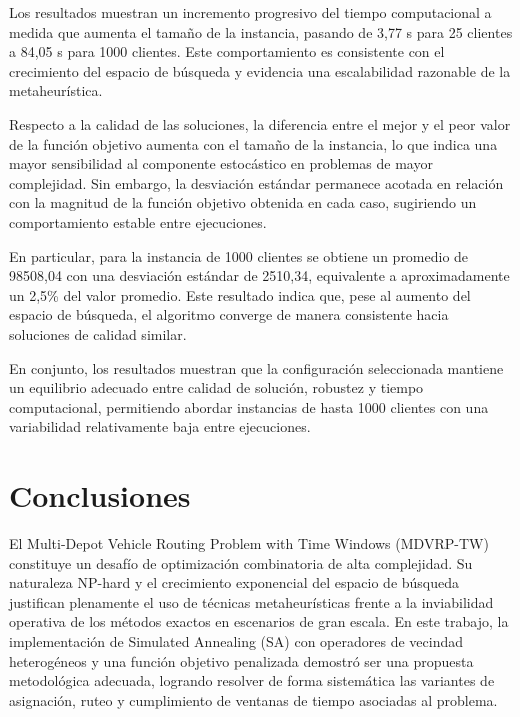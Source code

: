 \documentclass[letter, 10pt, dvipdfmx]{article}
\begin{document}
Los resultados muestran un incremento progresivo del tiempo computacional a medida que aumenta el tamaño de la instancia,
pasando de 3,77 s para 25 clientes a 84,05 s para 1000 clientes. Este comportamiento es consistente con el crecimiento
del espacio de búsqueda y evidencia una escalabilidad razonable de la metaheurística.

Respecto a la calidad de las soluciones, la diferencia entre el mejor y el peor valor de la función objetivo aumenta con
el tamaño de la instancia, lo que indica una mayor sensibilidad al componente estocástico en problemas de mayor complejidad.
Sin embargo, la desviación estándar permanece acotada en relación con la magnitud de la función objetivo obtenida en cada caso,
sugiriendo un comportamiento estable entre ejecuciones.

En particular, para la instancia de 1000 clientes se obtiene un promedio de 98508,04 con una desviación estándar de 2510,34,
equivalente a aproximadamente un 2,5\% del valor promedio. Este resultado indica que, pese al aumento del espacio de búsqueda,
el algoritmo converge de manera consistente hacia soluciones de calidad similar.

En conjunto, los resultados muestran que la configuración seleccionada mantiene un equilibrio adecuado entre calidad de solución,
robustez y tiempo computacional, permitiendo abordar instancias de hasta 1000 clientes con una variabilidad relativamente baja
entre ejecuciones.

\section{Conclusiones}
El Multi-Depot Vehicle Routing Problem with Time Windows (MDVRP-TW) constituye un desafío de optimización combinatoria de alta
complejidad. Su naturaleza NP-hard y el crecimiento exponencial del espacio de búsqueda justifican plenamente el uso de
técnicas metaheurísticas frente a la inviabilidad operativa de los métodos exactos en escenarios de gran escala. En este
trabajo, la implementación de Simulated Annealing (SA) con operadores de vecindad heterogéneos y una función objetivo
penalizada demostró ser una propuesta metodológica adecuada, logrando resolver de forma sistemática las variantes de
asignación, ruteo y cumplimiento de ventanas de tiempo asociadas al problema.
\end{document}
